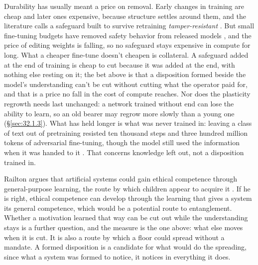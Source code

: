 Durability has usually meant a price on removal. Early changes in training are cheap and later ones expensive, because structure settles around them, and the literature calls a safeguard built to survive retraining \emph{tamper-resistant} \autocite{tamirisa2024tamper}. But small fine-tuning budgets have removed safety behavior from released models \autocite{qi2024finetuning}, and the price of editing weights is falling, so no safeguard stays expensive in compute for long. What a cheaper fine-tune doesn't cheapen is collateral. A safeguard added at the end of training is cheap to cut because it was added at the end, with nothing else resting on it; the bet above is that a disposition formed beside the model's understanding can't be cut without cutting what the operator paid for, and that is a price no fall in the cost of compute reaches. Nor does the plasticity regrowth needs last unchanged: a network trained without end can lose the ability to learn, so an old bearer may regrow more slowly than a young one (\S\ref{sec:32.1.3}). What has held longer is what was never trained in: leaving a class of text out of pretraining resisted ten thousand steps and three hundred million tokens of adversarial fine-tuning, though the model still used the information when it was handed to it \autocite{obrien2025deep}. That concerns knowledge left out, not a disposition trained in.

Railton argues that artificial systems could gain ethical competence through general-purpose learning, the route by which children appear to acquire it \autocite{railton2020ethical}. If he is right, ethical competence can develop through the learning that gives a system its general competence, which would be a potential route to entanglement. Whether a motivation learned that way can be cut out while the understanding stays is a further question, and the measure is the one above: what else moves when it is cut. It is also a route by which a floor could spread without a mandate. A formed disposition is a candidate for what would do the spreading, since what a system was formed to notice, it notices in everything it does.

